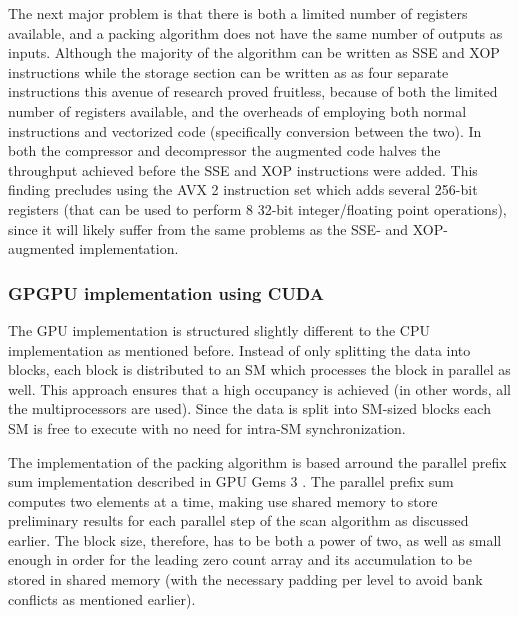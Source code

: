   The next major problem is that there is both a limited number of registers available, and a packing algorithm does not have the same number of outputs as inputs. Although
  the majority of the algorithm can be written as SSE and XOP instructions while the storage section can be written as as four separate instructions this avenue of research
  proved fruitless, because of both the limited number of registers available, and the overheads of employing both normal instructions and vectorized code (specifically conversion
  between the two). In both the compressor and decompressor the augmented code halves the throughput achieved before the SSE and XOP instructions were added. This finding precludes
  using the AVX 2 instruction set which adds several 256-bit registers (that can be used to perform 8 32-bit integer/floating point operations), since it will likely suffer from
  the same problems as the SSE- and XOP-augmented implementation.
  \subsubsection{GPGPU implementation using CUDA}
  The GPU implementation is structured slightly different to the CPU implementation as mentioned before. Instead of only splitting the data into blocks, each block is distributed to
  an SM which processes the block in parallel as well. This approach ensures that a high occupancy is achieved (in other words, all the multiprocessors are used). Since the data is
  split into SM-sized blocks each SM is free to execute with no need for intra-SM synchronization. 
  
  The implementation of the packing algorithm is based arround the parallel prefix sum implementation described in GPU Gems 3 \cite{harris2007parallel}. The parallel prefix sum computes two 
  elements at a time, making use shared memory to store preliminary results for each parallel step of the scan algorithm as discussed earlier. The block size, therefore, has to be both a power of 
  two, as well as small enough in order for the leading zero count array and its accumulation to be stored in shared memory (with the necessary padding per level to avoid bank conflicts as mentioned 
  earlier).
  
